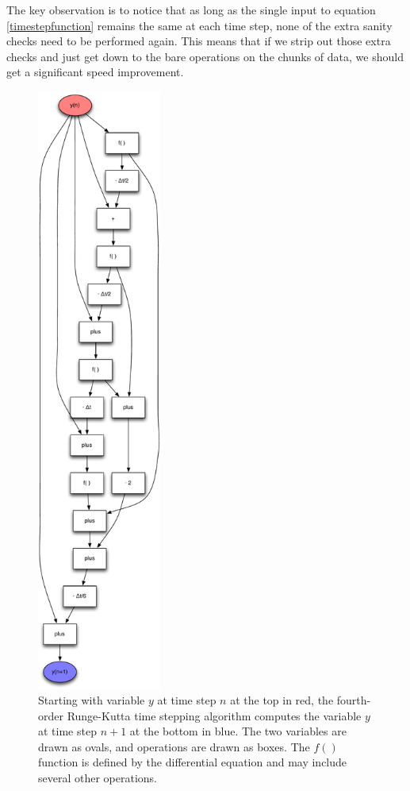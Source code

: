 \documentclass[11pt]{article}
\begin{document}
The key observation is to notice that as long as the single input to equation \ref{timestepfunction} remains the same at each time step, none of the extra sanity checks need to be performed again. This means that if we strip out those extra checks and just get down to the bare operations on the chunks of data, we should get a significant speed improvement.

\begin{figure}
\begin{center}
\includegraphics[width=1.6in]{RungeKutta4Graph}
\caption{Starting with variable $y$ at time step $n$ at the top in red, the fourth-order Runge-Kutta time stepping algorithm computes the variable $y$ at time step $n+1$ at the bottom in blue. The two variables are drawn as ovals, and operations are drawn as boxes. The $f()$ function is defined by the differential equation and may include several other operations.}
\label{RungeKutta4Graph}
\end{center}
\end{figure}
\end{document}
